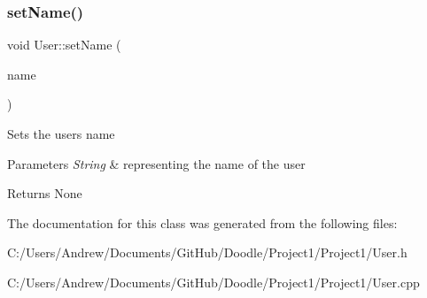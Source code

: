 \subsubsection{\texorpdfstring{set\+Name()}{setName()}}
{\footnotesize\ttfamily void User\+::set\+Name (\begin{DoxyParamCaption}\item[{std\+::string}]{name }\end{DoxyParamCaption})}

Sets the user\textquotesingle{}s name 
\begin{DoxyParams}{Parameters}
{\em String} & representing the name of the user \\
\hline
\end{DoxyParams}
\begin{DoxyReturn}{Returns}
None 
\end{DoxyReturn}


The documentation for this class was generated from the following files\+:\begin{DoxyCompactItemize}
\item 
C\+:/\+Users/\+Andrew/\+Documents/\+Git\+Hub/\+Doodle/\+Project1/\+Project1/User.\+h\item 
C\+:/\+Users/\+Andrew/\+Documents/\+Git\+Hub/\+Doodle/\+Project1/\+Project1/User.\+cpp\end{DoxyCompactItemize}
